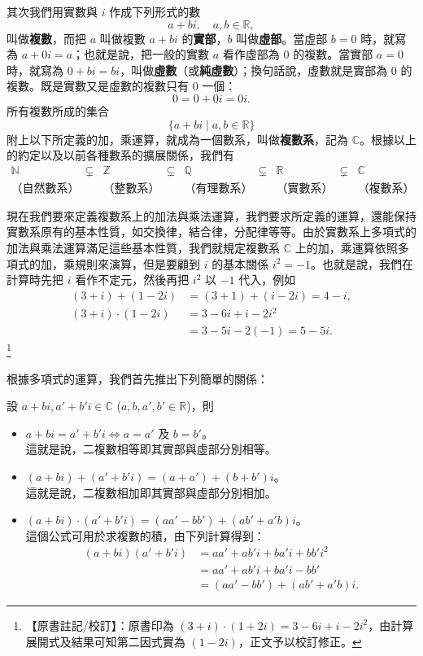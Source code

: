 其次我們用實數與 $i$ 作成下列形式的數
\[
a+bi, \quad a, b \in \mathbb{R},
\]
叫做\textbf{複數}，而把 $a$ 叫做複數 $a+bi$ 的\textbf{實部}，$b$ 叫做\textbf{虛部}。當虛部 $b=0$ 時，就寫為 $a+0i=a$；也就是說，把一般的實數 $a$ 看作虛部為 $0$ 的複數。當實部 $a=0$ 時，就寫為 $0+bi=bi$，叫做\textbf{虛數}（或\textbf{純虛數}）；換句話說，虛數就是實部為 $0$ 的複數。既是實數又是虛數的複數只有 $0$ 一個：
\[
0 = 0+0i = 0i.
\]
所有複數所成的集合
\[
\{a+bi \mid a, b \in \mathbb{R}\}
\]
附上以下所定義的加，乘運算，就成為一個數系，叫做\textbf{複數系}，記為 $\mathbb{C}$。根據以上的約定以及以前各種數系的擴展關係，我們有
\[
\begin{matrix}
\mathbb{N} & \subsetneq & \mathbb{Z} & \subsetneq & \mathbb{Q} & \subsetneq & \mathbb{R} & \subsetneq & \mathbb{C} \\
\text{（自然數系）} & & \text{（整數系）} & & \text{（有理數系）} & & \text{（實數系）} & & \text{（複數系）}
\end{matrix}
\]

現在我們要來定義複數系上的加法與乘法運算，我們要求所定義的運算，還能保持實數系原有的基本性質，如交換律，結合律，分配律等等。由於實數系上多項式的加法與乘法運算滿足這些基本性質，我們就規定複數系 $\mathbb{C}$ 上的加，乘運算依照多項式的加，乘規則來演算，但是要顧到 $i$ 的基本關係 $i^2=-1$。也就是說，我們在計算時先把 $i$ 看作不定元，然後再把 $i^2$ 以 $-1$ 代入，例如
\begin{align*}
(3+i)+(1-2i) &= (3+1)+(i-2i) = 4-i, \\
(3+i)\cdot(1-2i) &= 3-6i+i-2i^2 \\
&= 3-5i-2(-1) = 5-5i.
\end{align*}
\label{note:b4-ch5-p256-errata}\footnote{【原書註記/校訂】：原書印為 $(3+i)\cdot(1+2i) = 3-6i+i-2i^2$，由計算展開式及結果可知第二因式實為 $(1-2i)$，正文予以校訂修正。}

根據多項式的運算，我們首先推出下列簡單的關係：

設 $a+bi, a'+b'i \in \mathbb{C}$ ($a, b, a', b' \in \mathbb{R}$)，則
\begin{itemize}
  \item[(i)] $a+bi = a'+b'i \iff a=a' \text{ 及 } b=b'$。 \\
  這就是說，二複數相等即其實部與虛部分別相等。
  \item[(ii)] $(a+bi)+(a'+b'i) = (a+a')+(b+b')i$。 \\
  這就是說，二複數相加即其實部與虛部分別相加。
  \item[(iii)] $(a+bi)\cdot(a'+b'i) = (aa'-bb')+(ab'+a'b)i$。 \\
  這個公式可用於求複數的積，由下列計算得到：
  \begin{align*}
  (a+bi)(a'+b'i) &= aa'+ab'i+ba'i+bb'i^2 \\
  &= aa'+ab'i+ba'i-bb' \\
  &= (aa'-bb')+(ab'+a'b)i.
  \end{align*}
\end{itemize}

